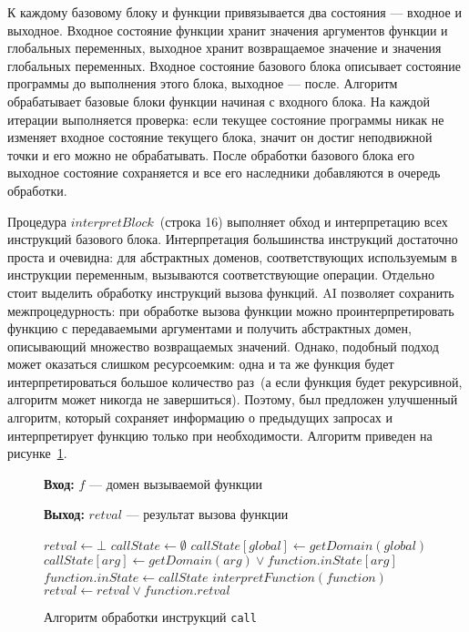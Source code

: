 К каждому базовому блоку и функции привязывается два состояния --- входное и 
выходное. Входное состояние функции хранит значения аргументов функции и 
глобальных переменных, выходное хранит возвращаемое значение и значения 
глобальных переменных. Входное состояние базового блока описывает состояние 
программы до выполнения этого блока, выходное --- после. Алгоритм обрабатывает 
базовые блоки функции начиная с входного блока. На каждой итерации выполняется
проверка: если текущее состояние программы никак не изменяет входное состояние
текущего блока, значит он достиг неподвижной точки и его можно не 
обрабатывать. После обработки базового блока его выходное состояние 
сохраняется и все его наследники добавляются в очередь обработки.

Процедура $interpretBlock$~(строка 16) выполняет обход и 
интерпретацию всех инструкций базового блока. Интерпретация большинства 
инструкций достаточно проста и очевидна: для абстрактных доменов, 
соответствующих используемым в инструкции переменным, вызываются 
соответствующие операции. Отдельно стоит выделить обработку инструкций вызова 
функций. AI позволяет сохранить межпроцедурность: при обработке вызова функции
можно проинтерпретировать функцию с передаваемыми аргументами и получить 
абстрактных домен, описывающий множество возвращаемых значений. Однако, 
подобный подход может оказаться слишком ресурсоемким: одна и та же функция 
будет интерпретироваться большое количество раз~(а если функция будет
рекурсивной, алгоритм может никогда не завершиться). Поэтому, был предложен 
улучшенный алгоритм, который сохраняет информацию о предыдущих запросах и 
интерпретирует функцию только при необходимости. Алгоритм приведен на 
рисунке~\ref{image:callArg}.

\begin{figure}[h!]
\textbf{Вход:} $f$ --- домен вызываемой функции

\textbf{Выход:} $retval$ --- результат вызова функции

\begin{algorithmic}[1]
\State $retval \gets \bot$
    \State $callState \gets \emptyset$
        \State $callState[global] \gets getDomain(global)$
    \EndFor
        \State $callState[arg] \gets getDomain(arg) \vee
        function.inState[arg]$
    \EndFor
        \State $function.inState \gets callState$
        \State $interpretFunction(function)$
        \State $retval \gets retval \vee function.retval$
    \EndIf
\EndFor
\end{algorithmic}
\caption{Алгоритм обработки инструкций \texttt{call}}
\label{image:callArg}
\end{figure}

